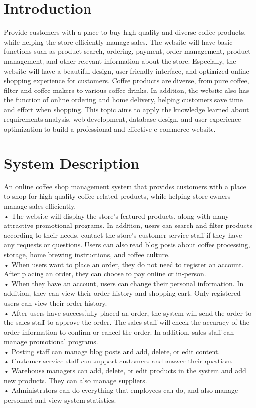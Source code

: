 \section{Introduction} %
Provide customers with a place to buy high-quality and diverse coffee products, while helping the store efficiently manage sales. The website will have basic functions such as product search, ordering, payment, order management, product management, and other relevant information about the store. Especially, the website will have a beautiful design, user-friendly interface, and optimized online shopping experience for customers. Coffee products are diverse, from pure coffee, filter and coffee makers to various coffee drinks. In addition, the website also has the function of online ordering and home delivery, helping customers save time and effort when shopping. This topic aims to apply the knowledge learned about requirements analysis, web development, database design, and user experience optimization to build a professional and effective e-commerce website.
\section{System Description} %
An online coffee shop management system that provides customers with a place to shop for high-quality coffee-related products, while helping store owners manage sales efficiently. \\
• The website will display the store's featured products, along with many attractive promotional programs. In addition, users can search and filter products according to their needs, contact the store's customer service staff if they have any requests or questions. Users can also read blog posts about coffee processing, storage, home brewing instructions, and coffee culture.\\
• When users want to place an order, they do not need to register an account. After placing an order, they can choose to pay online or in-person.\\
• When they have an account, users can change their personal information. In addition, they can view their order history and shopping cart. Only registered users can view their order history.\\
• After users have successfully placed an order, the system will send the order to the sales staff to approve the order. The sales staff will check the accuracy of the order information to confirm or cancel the order. In addition, sales staff can manage promotional programs.\\
• Posting staff can manage blog posts and add, delete, or edit content.\\
• Customer service staff can support customers and answer their questions.\\
• Warehouse managers can add, delete, or edit products in the system and add new products. They can also manage suppliers.\\
• Administrators can do everything that employees can do, and also manage personnel and view system statistics.
